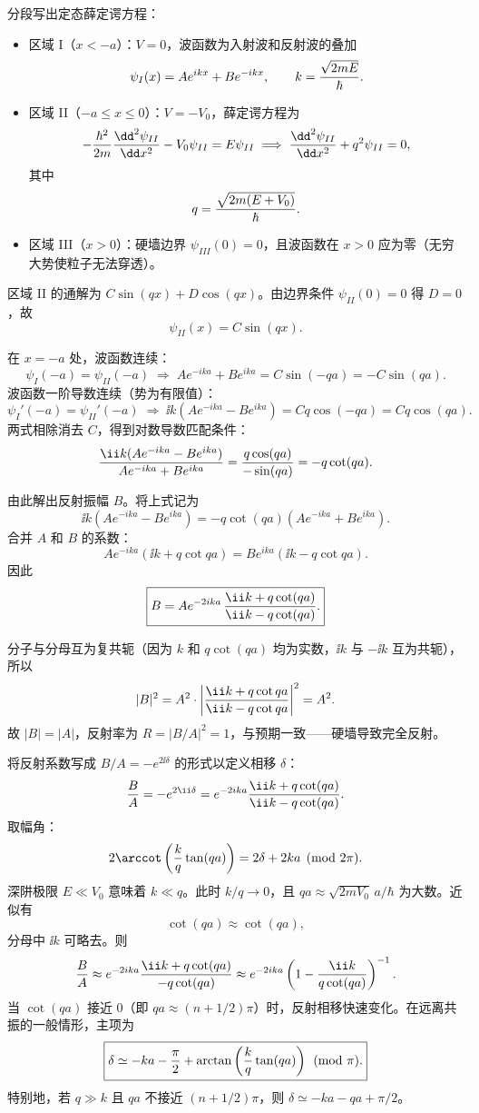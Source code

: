 \begin{solution}
分段写出定态薛定谔方程：
\begin{itemize}
\item 区域 I（$x<-a$）：$V=0$，波函数为入射波和反射波的叠加
\[
\psi_I(x)=Ae^{ikx}+Be^{-ikx},\qquad k={\sqrt{2mE}\over\hbar}.
\]
\item 区域 II（$-a\le x\le 0$）：$V=-V_0$，薛定谔方程为
\[
-{\hbar^2\over2m}{\dd^2\psi_{II}\over\dd x^2}-V_0\psi_{II}=E\psi_{II}
\;\Longrightarrow\;
{\dd^2\psi_{II}\over\dd x^2}+q^2\psi_{II}=0,
\]
其中
\[
q={\sqrt{2m(E+V_0)}\over\hbar}.
\]
\item 区域 III（$x>0$）：硬墙边界 $\psi_{III}(0)=0$，且波函数在 $x>0$ 应为零（无穷大势使粒子无法穿透）。
\end{itemize}

区域 II 的通解为 $C\sin(qx)+D\cos(qx)$。由边界条件 $\psi_{II}(0)=0$ 得 $D=0$，故
\[
\psi_{II}(x)=C\sin(qx).
\]

在 $x=-a$ 处，波函数连续：
\[
\psi_I(-a)=\psi_{II}(-a)\;\Longrightarrow\;Ae^{-ika}+Be^{ika}=C\sin(-qa)=-C\sin(qa).
\]
波函数一阶导数连续（势为有限值）：
\[
\psi_I'(-a)=\psi_{II}'(-a)\;\Longrightarrow\;
\ii k(Ae^{-ika}-Be^{ika})=Cq\cos(-qa)=Cq\cos(qa).
\]
两式相除消去 $C$，得到对数导数匹配条件：
\[
{\ii k(Ae^{-ika}-Be^{ika})\over Ae^{-ika}+Be^{ika}}={q\cos(qa)\over-\sin(qa)}=-q\cot(qa).
\]

由此解出反射振幅 $B$。将上式记为
\[
\ii k(Ae^{-ika}-Be^{ika})=-q\cot(qa)(Ae^{-ika}+Be^{ika}).
\]
合并 $A$ 和 $B$ 的系数：
\[
Ae^{-ika}(\ii k+q\cot qa)=Be^{ika}(\ii k-q\cot qa).
\]
因此
\[
\boxed{B=Ae^{-2ika}\,{\ii k+q\cot(qa)\over\ii k-q\cot(qa)}.}
\]

分子与分母互为复共轭（因为 $k$ 和 $q\cot(qa)$ 均为实数，$\ii k$ 与 $-\ii k$ 互为共轭），所以
\[
|B|^2=A^2\cdot\left|{\ii k+q\cot qa\over\ii k-q\cot qa}\right|^2=A^2.
\]
故 $|B|=|A|$，反射率为 $R=|B/A|^2=1$，与预期一致——硬墙导致完全反射。

将反射系数写成 $B/A=-e^{2\ii\delta}$ 的形式以定义相移 $\delta$：
\[
{B\over A}=-e^{2\ii\delta}=e^{-2ika}{\ii k+q\cot(qa)\over\ii k-q\cot(qa)}.
\]
取幅角：
\[
2\arccot\left({k\over q}\tan(qa)\right)=2\delta+2ka\pmod{2\pi}.
\]
深阱极限 $E\ll V_0$ 意味着 $k\ll q$。此时 $k/q\to0$，且 $qa\approx\sqrt{2mV_0}\,a/\hbar$ 为大数。近似有
\[
\cot(qa)\approx\cot\left(qa\right),
\]
分母中 $\ii k$ 可略去。则
\[
{B\over A}\approx e^{-2ika}{\ii k+q\cot(qa)\over -q\cot(qa)}\approx e^{-2ika}\left(1-{\ii k\over q\cot(qa)}\right)^{-1}.
\]
当 $\cot(qa)$ 接近 $0$（即 $qa\approx (n+1/2)\pi$）时，反射相移快速变化。在远离共振的一般情形，主项为
\[
\boxed{\delta\simeq -ka-{\pi\over2}+\arctan\left({k\over q}\tan(qa)\right)\pmod{\pi}.}
\]
特别地，若 $q\gg k$ 且 $qa$ 不接近 $(n+1/2)\pi$，则 $\delta\simeq -ka-qa+\pi/2$。
\end{solution}

